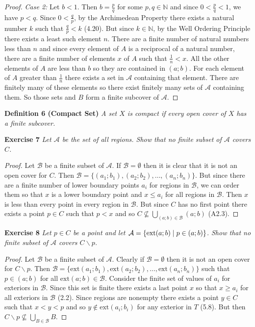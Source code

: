 \documentclass{article}
\begin{document}
\begin{flushleft}
\begin{proof}
\textit{Case 2:} Let $b < 1$. Then $b=\frac{p}{q}$ for some $p,q \in \mathbb{N}$ and since $0 < \frac{p}{q} < 1$, we have $p<q$. Since $0<\frac{q}{p}$, by the Archimedean Property there exists a natural number $k$ such that $\frac{q}{p} < k$ (4.20). But since $k \in \mathbb{N}$, by the Well Ordering Principle there exists a least such element $n$. There are a finite number of natural numbers less than $n$ and since every element of $A$ is a reciprocal of a natural number, there are a finite number of elements $x$ of $A$ such that $\frac{1}{n} < x$. All the other elements of $A$ are less than $b$ so they are contained in $(a;b)$. For each element of $A$ greater than $\frac{1}{n}$ there exists a set in $\mathcal{A}$ containing that element. There are finitely many of these elements so there exist finitely many sets of $\mathcal{A}$ containing them. So those sets and $B$ form a finite subcover of $\mathcal{A}$.
\end{proof}

\textbf{Definition 6 (Compact Set)}
\textsl{A set $X$ is compact if every open cover of $X$ has a finite subcover.}\newline

\textbf{Exercise 7}
\textsl{Let $\mathcal{A}$ be the set of all regions. Show that no finite subset of $\mathcal{A}$ covers $C$.}
\begin{proof}
Let $\mathcal{B}$ be a finite subset of $\mathcal{A}$. If $\mathcal{B} = \emptyset$ then it is clear that it is not an open cover for $C$. Then $\mathcal{B}=\{(a_1;b_1),(a_2;b_2), \dots ,(a_n;b_n)\}$. But since there are a finite number of lower boundary points $a_i$ for regions in $\mathcal{B}$, we can order them so that $x$ is a lower boundary point and $x \leq a_i$ for all regions in $\mathcal{B}$. Then $x$ is less than every point in every region in $\mathcal{B}$. But since $C$ has no first point there exists a point $p \in C$ such that $p < x$ and so $C \nsubseteq \bigcup_{(a;b) \in \mathcal{B}} (a;b)$ (A2.3).
\end{proof}

\textbf{Exercise 8}
\textsl{Let $p \in C$ be a point and let $\mathcal{A}=\{ \textup{ext}(a;b) \mid p \in (a;b) \}$. Show that no finite subset of $\mathcal{A}$ covers $C \backslash p$.}
\begin{proof}
Let $\mathcal{B}$ be a finite subset of $\mathcal{A}$. Clearly if $\mathcal{B} = \emptyset$ then it is not an open cover for $C \backslash p$. Then $\mathcal{B}=\{ \text{ext}(a_1;b_1), \text{ext}(a_2;b_2), \dots ,\text{ext}(a_n;b_n) \}$ such that $p \in (a;b)$ for all $\text{ext}(a;b) \in \mathcal{B}$. Consider the finite set of values of $a_i$ for exteriors in $\mathcal{B}$. Since this set is finite there exists a last point $x$ so that $x \geq a_i$ for all exteriors in $\mathcal{B}$ (2.2). Since regions are nonempty there exists a point $y \in C$ such that $x<y<p$ and so $y \notin \text{ext}(a_i;b_i)$ for any exterior in $T$ (5.8). But then $C \backslash p \nsubseteq \bigcup_{B \in \mathcal{B}} B$.
\end{proof}


\end{flushleft}
\end{document}
